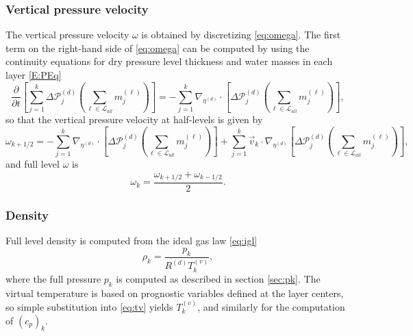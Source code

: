 \documentclass{agujournal}
\begin{document}
{\subsubsection{Vertical pressure velocity}
The vertical pressure velocity $\omega$ is obtained by discretizing \eqref{eq:omega}. The first term on the right-hand side of \eqref{eq:omega} can be computed by using the continuity equations for dry pressure level thickness and water masses in each layer \eqref{E:PEq}
\begin{equation}
\frac{\partial }{\partial t}\left[\sum_{j=1}^k \Delta \mathcal{P}^{(d)}_j \left( \sum_{\ell \in \mathcal{L}_{all}} m_j^{(\ell)}\right)\right] = -\sum_{j=1}^k \nabla_{\eta^{(d)}}\cdot \left[ \Delta \mathcal{P}^{(d)}_j\left(\sum_{\ell \in \mathcal{L}_{all}} m_j^{(\ell)} \right)\right],
\end{equation}
so that the vertical pressure velocity at half-levels is given by
\begin{equation}
\omega_{k+1/2}=-\sum_{j=1}^k \nabla_{\eta^{(d)}}\cdot \left[ \Delta \mathcal{P}^{(d)}_j\left(\sum_{\ell \in \mathcal{L}_{all}} m_j^{(\ell)} \right)\right]+\sum_{j=1}^k \vec{v}_k \cdot \nabla_{\eta^{(d)}}\left[ \Delta \mathcal{P}^{(d)}_j\left( \sum_{\ell \in \mathcal{L}_{all}} m_j^{(\ell)}\right)\right],
\end{equation}
and full level $\omega$ is
\begin{equation}
\omega_k=\frac{\omega_{k+1/2}+\omega_{k-1/2}}{2}.
\end{equation}
\subsubsection{Density}
Full level density is computed from the ideal gas law \eqref{eq:igl}
\begin{equation}
\rho_k=\frac{p_k}{R^{(d)} T_k^{(v)}},
\end{equation}
where the full pressure $p_k$ is computed as described in section \ref{sec:pk}. The virtual temperature is based on prognostic variables defined at the layer centers, so simple substitution into \eqref{eq:tv} yields $T_k^{(v)}$, and similarly for the computation of $\left( c_p\right)_k$.
}
\end{document}
